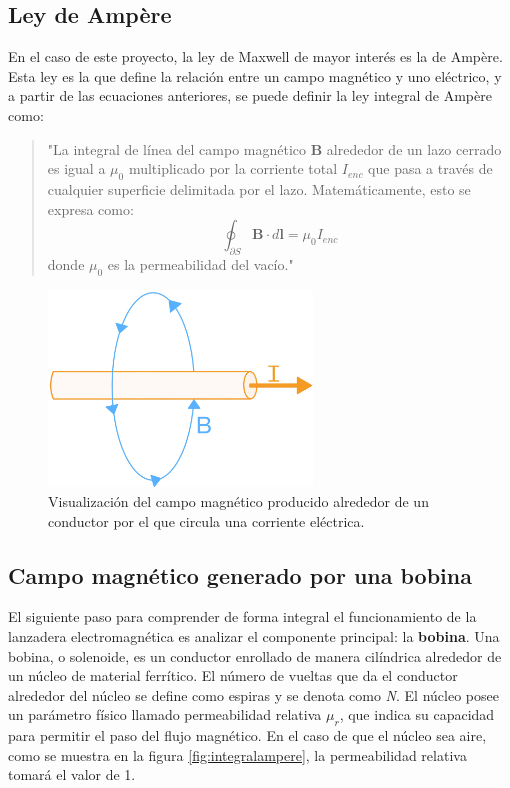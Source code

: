 \subsection{Ley de Ampère}

En el caso de este proyecto, la ley de Maxwell de mayor interés es la de Ampère. Esta ley es la que define la relación entre un campo magnético y uno eléctrico, y a partir de las ecuaciones anteriores, se puede definir la ley integral de Ampère como:

\begin{quote}
    "La integral de línea del campo magnético \(\mathbf{B}\) alrededor de un lazo cerrado es igual a \(\mu_0\) multiplicado por la corriente total \(I_{enc}\) que pasa a través de cualquier superficie delimitada por el lazo. Matemáticamente, esto se expresa como:
    \[
    \oint_{\partial S} \mathbf{B} \cdot d\mathbf{l} = \mu_0 I_{enc}
    \]
    donde \(\mu_0\) es la permeabilidad del vacío."
\end{quote}

\begin{figure}[H]
    \centering %
    \includegraphics[width=7cm]{FigurasMemoria/amperelaw.jpg}
    \caption{Visualización del campo magnético producido alrededor de un conductor por el que circula una corriente eléctrica.}
    \label{fig:amperelaw} %
\end{figure}

\subsection{Campo magnético generado por una bobina}

El siguiente paso para comprender de forma integral el funcionamiento de la lanzadera electromagnética es analizar el componente principal: la \textbf{bobina}. Una bobina, o solenoide, es un conductor enrollado de manera cilíndrica alrededor de un núcleo de material ferrítico. El número de vueltas que da el conductor alrededor del núcleo se define como espiras y se denota como \textit{N}. El núcleo posee un parámetro físico llamado permeabilidad relativa \(\mu_r\), que indica su capacidad para permitir el paso del flujo magnético. En el caso de que el núcleo sea aire, como se muestra en la figura \ref{fig:integralampere}, la permeabilidad relativa tomará el valor de 1.

